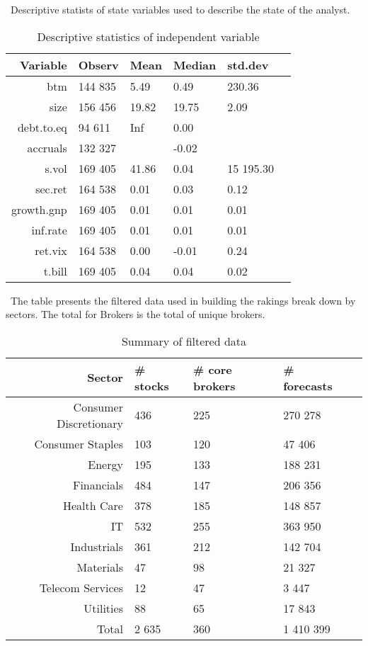 \documentclass{article}\usepackage[]{graphicx}\usepackage[]{color}
\begin{document}
\begin{table}
\caption{Descriptive statistics of independent variable}
\ Descriptive statists of state variables used to describe the state of the analyst.
\begin{center}
\begin{tabularx}{\linewidth}{r*{5}{Y}}
\toprule
Variable & Observ & Mean & Median & std.dev\\
\midrule 
 btm & 144 835 & 5.49 & 0.49 & 230.36 \\ 
  size & 156 456 & 19.82 & 19.75 & 2.09 \\ 
  debt.to.eq & 94 611 & Inf & 0.00 &  \\ 
  accruals & 132 327 &  & -0.02 &  \\ 
  s.vol & 169 405 & 41.86 & 0.04 & 15 195.30 \\ 
  sec.ret & 164 538 & 0.01 & 0.03 & 0.12 \\ 
  growth.gnp & 169 405 & 0.01 & 0.01 & 0.01 \\ 
  inf.rate & 169 405 & 0.01 & 0.01 & 0.01 \\ 
  ret.vix & 164 538 & 0.00 & -0.01 & 0.24 \\ 
  t.bill & 169 405 & 0.04 & 0.04 & 0.02 \\ 
  
\bottomrule
\end{tabularx}
\end{center}
\label{tab:ind.vvs}
\end{table}


\begin{table}
\caption{Summary of filtered data}
\ The table presents the filtered data used in building the rakings break down by sectors. The total for Brokers is the total of unique brokers.

\begin{center}
\begin{tabularx}{\linewidth}{r*{4}{Y}}
\toprule
Sector & \# stocks & \# core brokers & \# forecasts \\ 
\midrule
 Consumer Discretionary & 436 & 225 & 270 278 \\ 
  Consumer Staples & 103 & 120 & 47 406 \\ 
  Energy & 195 & 133 & 188 231 \\ 
  Financials & 484 & 147 & 206 356 \\ 
  Health Care & 378 & 185 & 148 857 \\ 
  IT & 532 & 255 & 363 950 \\ 
  Industrials & 361 & 212 & 142 704 \\ 
  Materials &  47 &  98 & 21 327 \\ 
  Telecom Services &  12 &  47 & 3 447 \\ 
  Utilities &  88 &  65 & 17 843 \\ 
   \midrule 
Total & 2 635 & 360 & 1 410 399 \\ 
  
\bottomrule
\end{tabularx}
\label{table:filtered.summary}
\end{center}
\end{table}
\end{document}
